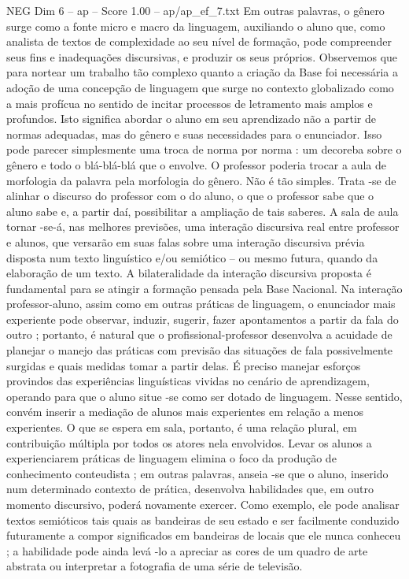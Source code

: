 \begin{textsample}{NEG Dim 6 – ap – Score 1.00 – ap/ap\_ef\_7.txt}
Em outras palavras, o gênero surge como a fonte micro e macro da linguagem, auxiliando o aluno que, como analista de textos de complexidade ao seu nível de formação, pode compreender seus fins e inadequações discursivas, e produzir os seus próprios.
Observemos que para nortear um trabalho tão complexo quanto a criação da Base foi necessária a adoção de uma concepção de linguagem que surge no contexto globalizado como a mais profícua no sentido de incitar processos de letramento mais amplos e profundos.
Isto significa abordar o aluno em seu aprendizado não a partir de normas adequadas, mas do gênero e suas necessidades para o enunciador.
Isso pode parecer simplesmente uma troca de norma por norma : um decoreba sobre o gênero e todo o blá-blá-blá que o envolve.
O professor poderia trocar a aula de morfologia da palavra pela morfologia do gênero.
Não é tão simples.
Trata -se de alinhar o discurso do professor com o do aluno, o que o professor sabe que o aluno sabe e, a partir daí, possibilitar a ampliação de tais saberes.
A sala de aula tornar -se-á, nas melhores previsões, uma interação discursiva real entre professor e alunos, que versarão em suas falas sobre uma interação discursiva prévia disposta num texto linguístico e/ou semiótico – ou mesmo futura, quando da elaboração de um texto.
A bilateralidade da interação discursiva proposta é fundamental para se atingir a formação pensada pela Base Nacional.
Na interação professor-aluno, assim como em outras práticas de linguagem, o enunciador mais experiente pode observar, induzir, sugerir, fazer apontamentos a partir da fala do outro ; portanto, é natural que o profissional-professor desenvolva a acuidade de planejar o manejo das práticas com previsão das situações de fala possivelmente surgidas e quais medidas tomar a partir delas.
É preciso manejar esforços provindos das experiências linguísticas vividas no cenário de aprendizagem, operando para que o aluno situe -se como ser dotado de linguagem.
Nesse sentido, convém inserir a mediação de alunos mais experientes em relação a menos experientes.
O que se espera em sala, portanto, é uma relação plural, em contribuição múltipla por todos os atores nela envolvidos.
Levar os alunos a experienciarem práticas de linguagem elimina o foco da produção de conhecimento conteudista ; em outras palavras, anseia -se que o aluno, inserido num determinado contexto de prática, desenvolva habilidades que, em outro momento discursivo, poderá novamente exercer.
Como exemplo, ele pode analisar textos semióticos tais quais as bandeiras de seu estado e ser facilmente conduzido futuramente a compor significados em bandeiras de locais que ele nunca conheceu ; a habilidade pode ainda levá -lo a apreciar as cores de um quadro de arte abstrata ou interpretar a fotografia de uma série de televisão.

\end{textsample}
